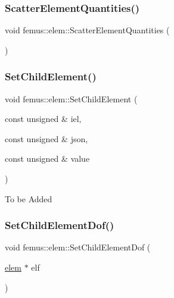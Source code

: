 \mbox{\label{classfemus_1_1elem_a0fe3ec99da1be3a261693c929d255dcd}} 
\subsubsection{\texorpdfstring{Scatter\+Element\+Quantities()}{ScatterElementQuantities()}}
{\footnotesize\ttfamily void femus\+::elem\+::\+Scatter\+Element\+Quantities (\begin{DoxyParamCaption}{ }\end{DoxyParamCaption})\hspace{0.3cm}{\ttfamily [inline]}}

\mbox{\label{classfemus_1_1elem_ab5e398bd855bc8dc152313e1bd4c3f39}} 
\subsubsection{\texorpdfstring{Set\+Child\+Element()}{SetChildElement()}}
{\footnotesize\ttfamily void femus\+::elem\+::\+Set\+Child\+Element (\begin{DoxyParamCaption}\item[{const unsigned \&}]{iel,  }\item[{const unsigned \&}]{json,  }\item[{const unsigned \&}]{value }\end{DoxyParamCaption})}

To be Added \mbox{\label{classfemus_1_1elem_a6ec442274aeef5afd913e10a61a4f0ba}} 
\subsubsection{\texorpdfstring{Set\+Child\+Element\+Dof()}{SetChildElementDof()}}
{\footnotesize\ttfamily void femus\+::elem\+::\+Set\+Child\+Element\+Dof (\begin{DoxyParamCaption}\item[{\mbox{\hyperlink{classfemus_1_1elem}{elem}} $\ast$}]{elf }\end{DoxyParamCaption})}

